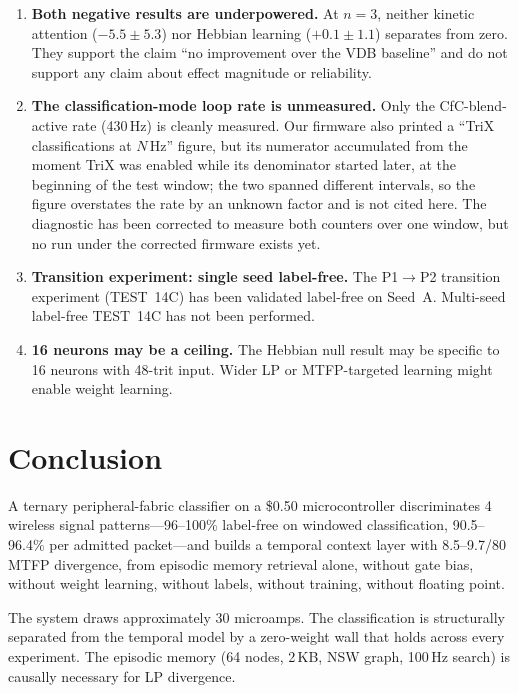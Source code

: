 \documentclass[11pt,letterpaper]{article}
\begin{document}
\begin{enumerate}
\item \textbf{Both negative results are underpowered.} At $n=3$, neither kinetic attention ($-5.5 \pm 5.3$) nor Hebbian learning ($+0.1 \pm 1.1$) separates from zero. They support the claim ``no improvement over the VDB baseline'' and do not support any claim about effect magnitude or reliability.

\item \textbf{The classification-mode loop rate is unmeasured.} Only the CfC-blend-active rate (430\,Hz) is cleanly measured. Our firmware also printed a ``TriX classifications at $N$\,Hz'' figure, but its numerator accumulated from the moment TriX was enabled while its denominator started later, at the beginning of the test window; the two spanned different intervals, so the figure overstates the rate by an unknown factor and is not cited here. The diagnostic has been corrected to measure both counters over one window, but no run under the corrected firmware exists yet.

\item \textbf{Transition experiment: single seed label-free.} The P1$\to$P2 transition experiment (TEST~14C) has been validated label-free on Seed~A. Multi-seed label-free TEST~14C has not been performed.

\item \textbf{16 neurons may be a ceiling.} The Hebbian null result may be specific to 16 neurons with 48-trit input. Wider LP or MTFP-targeted learning might enable weight learning.
\end{enumerate}

\section{Conclusion}

A ternary peripheral-fabric classifier on a \$0.50 microcontroller discriminates 4 wireless signal patterns---96--100\% label-free on windowed classification, 90.5--96.4\% per admitted packet---and builds a temporal context layer with 8.5--9.7/80 MTFP divergence, from episodic memory retrieval alone, without gate bias, without weight learning, without labels, without training, without floating point.

The system draws approximately 30 microamps. The classification is structurally separated from the temporal model by a zero-weight wall that holds across every experiment. The episodic memory (64 nodes, 2\,KB, NSW graph, 100\,Hz search) is causally necessary for LP divergence.
\end{document}

